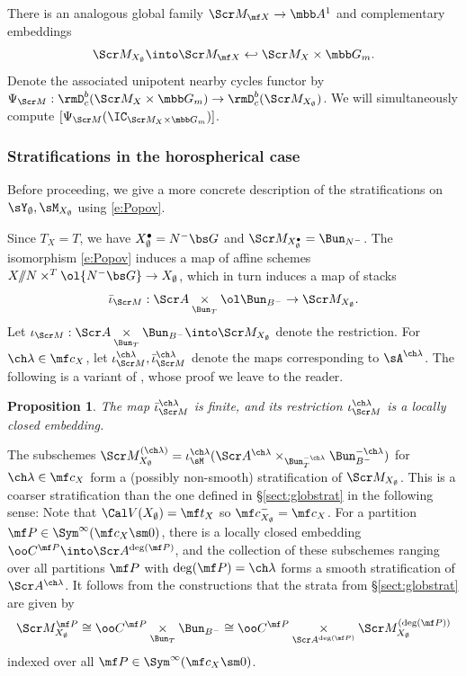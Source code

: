 \documentclass[final]{amsart}
\newtheorem{prop}[subsubsection]{Proposition}
\theoremstyle{remark}
\theoremstyle{definition}
\numberwithin{equation}{section}
\begin{document}
\smallskip

There is an analogous global family $\Scr M_{\mf X} \to \mbb A^1$ 
and complementary embeddings 
\[ \Scr M_{X_\emptyset} \into \Scr M_{\mf X} \hookleftarrow \Scr M_X \times \mbb G_m.  \]
Denote the associated unipotent nearby cycles functor by 
$\Psi_{\Scr M} : \rmD^b_c(\Scr M_X\times \mbb G_m) \to \rmD^b_c(\Scr M_{X_\emptyset})$.
We will simultaneously compute 
$[\Psi_{\Scr M}(\IC_{\Scr M_X\times \mbb G_m})]$.

\subsubsection{Stratifications in the horospherical case} \label{sect:horo-strat}
Before proceeding, we give a more concrete description of the stratifications
on $\sY_\emptyset, \sM_{X_\emptyset}$ using \eqref{e:Popov}. 

Since $T_X=T$, we have $X_\emptyset^\bullet = N^-\bs G$ and 
$\Scr M_{X_\emptyset^\bullet} = \Bun_{N^-}$. 
The isomorphism \eqref{e:Popov} induces a map of affine schemes
$X/\!\!/N \times^T \ol{N^-\bs G} \to X_\emptyset$, which in turn induces
a map of stacks 
\[ \bar\iota_{\Scr M} : \Scr A \underset{\Bun_T} \times \ol\Bun_{B^-} \to \Scr M_{X_\emptyset}. \]
Let $\iota_{\Scr M} : \Scr A \underset{\Bun_T}\times \Bun_{B^-} \into \Scr M_{X_\emptyset}$ 
denote the restriction. 
For $\ch\lambda \in \mf c_X$, let $\iota^{\ch\lambda}_{\Scr M}, \bar\iota^{\ch\lambda}_{\Scr M}$ 
denote the maps corresponding to $\sA^{\ch\lambda}$.
The following is a variant of \cite[Proposition 1.2.7]{BG}, whose proof we leave to the reader.
\begin{prop}
The map $\bar\iota_{\Scr M}^{\ch\lambda}$ is finite, and its restriction $\iota_{\Scr M}^{\ch\lambda}$ is 
a locally closed embedding. 
\end{prop}

The subschemes
$\Scr M_{X_\emptyset}^{(\ch\lambda)} = \iota_\sM^{\ch\lambda}(\Scr A^{\ch\lambda} \times_{\Bun_T^{-\ch\lambda}} \Bun_{B^-}^{-\ch\lambda})$ for $\ch\lambda\in \mf c_X$  
form a (possibly non-smooth) stratification
of $\Scr M_{X_\emptyset}$. 
This is a coarser stratification than the one defined in \S\ref{sect:globstrat}
in the following sense: 
Note that $\Cal V(X_\emptyset) = \mf t_X$ so $\mf c_{X_\emptyset}^- = \mf c_X$. 
For a partition $\mf P \in \Sym^\infty(\mf c_X\sm 0)$, 
there is a locally closed embedding $\oo C^{\mf P} \into \Scr A^{\deg(\mf P)}$, and the collection of these
subschemes ranging over all partitions $\mf P$ with $\deg(\mf P)=\ch\lambda$ forms a smooth
stratification of $\Scr A^{\ch\lambda}$. It follows from the constructions
that the strata from \S\ref{sect:globstrat} are given by 
\[ \Scr M^{\mf P}_{X_\emptyset} \cong 
\oo C^{\mf P} \underset{\Bun_T}\times \Bun_{B^-} \cong \oo C^{\mf P} \underset{\Scr A^{\deg(\mf P)}}\times \Scr M_{X_\emptyset}^{(\deg(\mf P))} \]
indexed over all $\mf P \in \Sym^\infty(\mf c_X\sm 0)$.
\end{document}
